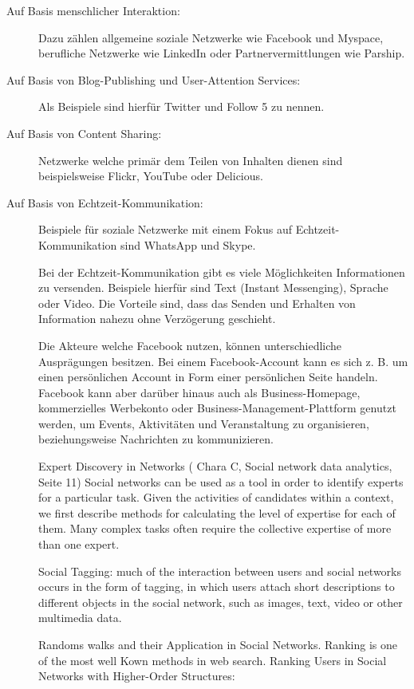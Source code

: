 \begin{description}
\item[Auf Basis menschlicher Interaktion:] Dazu zählen allgemeine soziale Netzwerke wie Facebook und Myspace, berufliche Netzwerke wie LinkedIn oder Partnervermittlungen wie Parship.
\item[Auf Basis von Blog-Publishing und User-Attention Services:] Als Beispiele sind hierfür Twitter und Follow 5 zu nennen.
\item[Auf Basis von Content Sharing:] Netzwerke welche primär dem Teilen von Inhalten dienen sind beispielsweise Flickr, YouTube oder Delicious.
\item[Auf Basis von Echtzeit-Kommunikation:] Beispiele für soziale Netzwerke mit einem Fokus auf Echtzeit-Kommunikation sind WhatsApp und Skype.

Bei der Echtzeit-Kommunikation gibt es viele Möglichkeiten Informationen zu versenden. Beispiele hierfür sind Text (Instant Messenging), Sprache oder Video. Die Vorteile sind, dass das Senden und Erhalten von Information nahezu ohne Verzögerung geschieht.

Die Akteure welche Facebook nutzen, können unterschiedliche Ausprägungen besitzen. Bei einem Facebook-Account kann es sich z. B. um einen persönlichen Account in Form einer persönlichen Seite handeln. Facebook kann aber darüber hinaus auch als Business-Homepage, kommerzielles Werbekonto oder Business-Management-Plattform genutzt werden, um Events, Aktivitäten und Veranstaltung zu organisieren, beziehungsweise Nachrichten zu kommunizieren.

Expert Discovery in Networks ( Chara C, Social network data analytics, Seite 11) \glqq{}Social networks can be used as a tool in order to identify experts for a particular task. Given the activities of candidates within a context, we first describe methods for calculating the level of expertise for each of them. Many complex tasks often require the collective expertise of more than one expert.\grqq

\glqq{}Social Tagging:  much of the interaction between users and social networks occurs in the form of tagging, in which users attach short descriptions to different objects in the social network, such as images, text, video or other multimedia data.\grqq

Randoms walks and their Application in Social Networks. Ranking is one of the most well Kown methods in web search. Ranking Users in Social Networks with Higher-Order Structures:


\end{description}
